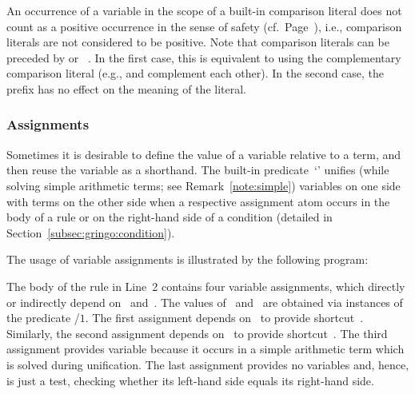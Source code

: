 \begin{note}
An occurrence of a variable in the scope of a built-in comparison literal
does not count as a positive occurrence in the sense of safety (cf.\ Page~\pageref{pg:safe}),
i.e.,
comparison literals are not considered to be positive.
Note that comparison literals can be preceded by  or ~.
In the first case, this is equivalent to using the complementary comparison literal
(e.g., \code{<} and \code{>=} complement each other).
In the second case, the prefix has no effect on the meaning of the literal.
%
\end{note}

\subsubsection{Assignments}\label{subsec:gringo:assign}

Sometimes  it is desirable to define the value of a variable relative to a term,
and then reuse the variable as a shorthand.
The built-in predicate~`\code{=}' unifies
(while solving simple arithmetic terms; see Remark~\ref{note:simple})
variables on one side with terms on the other side
when a respective assignment atom occurs
in the body of a rule or on the right-hand side of a condition
(detailed in Section~\ref{subsec:gringo:condition}).

\begin{example}\label{ex:assign}
The usage of variable assignments is illustrated by the following program:%
%
%

%
The body of the rule in Line~2 contains four variable assignments,
which directly or indirectly depend on~ and~.
The values of~ and~ are obtained via instances of the predicate /$1$.
The first assignment depends on~ to provide shortcut~.
Similarly, the second assignment depends on~ to provide shortcut~.
The third assignment provides variable  because it occurs in a simple arithmetic term
which is solved during unification.
The last assignment provides no variables and,
hence, is just a test,
checking whether its left-hand side equals its right-hand side.
\end{example}

